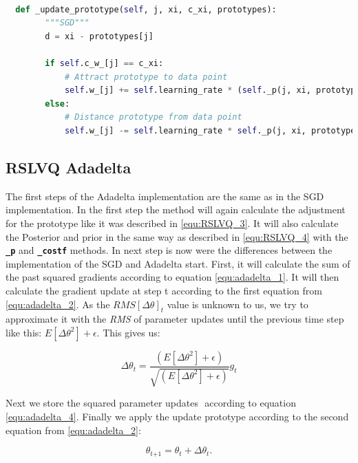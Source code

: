 \documentclass[12pt,oneside,a4paper,parskip]{scrbook}
\begin{document}
\begin{lstlisting}[label=lst:sgd,
  language=python,
  firstnumber=1,
  caption= Method \texttt{\_update\_prototype} as it was used in \cite{PassiveDriftonRSLVQ}.]			   

  def _update_prototype(self, j, xi, c_xi, prototypes):
        """SGD"""
        d = xi - prototypes[j]

        if self.c_w_[j] == c_xi:
            # Attract prototype to data point
            self.w_[j] += self.learning_rate * (self._p(j, xi, prototypes=self.w_, y=c_xi) -  self._p(j, xi, prototypes=self.w_)) * d
        else:
            # Distance prototype from data point
            self.w_[j] -= self.learning_rate * self._p(j, xi, prototypes=self.w_) * d
\end{lstlisting}

\subsection{RSLVQ Adadelta}

The first steps of the Adadelta implementation are the same as in the SGD implementation. In the first step the method will
again calculate the adjustment for the prototype like it was described in \ref{equ:RSLVQ_3}.
It will also calculate the Posterior and prior in the same way as described in \ref{equ:RSLVQ_4} with the \textbf{\texttt{\_p}} and
\textbf{\texttt{\_costf}} methods.
In next step is now were the differences between the implementation of the SGD and Adadelta start.
First, it will calculate the sum of the past squared gradients according to equation \ref{equ:adadelta_1}.
It will then calculate the gradient update at step t according to the first equation from \ref{equ:adadelta_2}.
As the $\textit{RMS}[\Delta\theta]_t$ value is unknown to us, we try to approximate it with the \textit{RMS} of 
parameter updates until the previous time step like this: $E[\Delta\theta^2] + \epsilon$.
This gives us:

\begin{equation}
  \Delta \theta_t = \frac{(E[\Delta\theta^2] + \epsilon)}{\sqrt{(E[\Delta\theta^2] + \epsilon)}} g_t
\end{equation}

Next we store the squared parameter updates $ $ according to equation \ref{equ:adadelta_4}.
Finally we apply the update prototype according to the second equation from \ref{equ:adadelta_2}:

\begin{equation}
  \theta_\textit{t+1} = \theta_t + \Delta\theta_t.
\end{equation}
\end{document}
